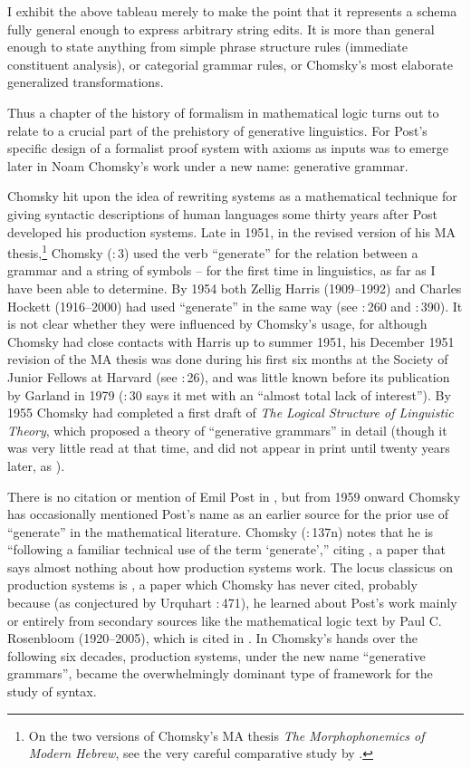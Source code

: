 \documentclass[output=paper]{langscibook}
\begin{document}
I exhibit the above tableau merely to make the point that it represents a schema fully general enough to express arbitrary string edits. It is more than general enough to state anything from simple phrase structure rules (immediate constituent analysis), or categorial grammar rules, or Chomsky's most elaborate generalized transformations.

Thus a chapter of the history of formalism in mathematical logic turns out to relate to a crucial part of the prehistory of generative linguistics. For Post's specific design of a formalist proof system with axioms as inputs was to emerge later in Noam Chomsky's work under a new name: generative grammar.

Chomsky hit upon the idea of rewriting systems as a mathematical technique for giving syntactic descriptions of human languages some thirty years after Post developed his production systems.  Late in 1951, in the revised version of his MA thesis,\footnote{On the two versions of Chomsky's MA thesis \textit{The Morphophonemics of Modern Hebrew}, see the very careful comparative study by \citet{Daniels10}.} Chomsky (\citeyear{Chomsky51b}:\,3) used the verb ``generate'' for the relation between a grammar and a string of symbols – for the first time in linguistics, as far as I have been able to determine.  By 1954 both Zellig Harris (1909--1992) and Charles Hockett (1916--2000) had used ``generate'' in the same way (see \citealt{Harris54transfer}:\,260 and \citealt{Hockett54}:\,390). It is not clear whether they were influenced by Chomsky's usage, for although Chomsky had close contacts with Harris up to summer 1951, his December 1951 revision of the MA thesis was done during his first six months at the Society of Junior Fellows at Harvard (see \citealt{Chomsky75LSLT}:\,26), and was little known before its publication by Garland in 1979 (\citealt{Chomsky75LSLT}:\,30 says it met with an ``almost total lack of interest''). By 1955 \nocite{Chomsky55LSLT} Chomsky had completed a first draft of \textit{The Logical Structure of Linguistic Theory}, which proposed a theory of ``generative grammars'' in detail (though it was very little read at that time, and did not appear in print until twenty years later, as \citealt{Chomsky75LSLT}).

There is no citation or mention of Emil Post in \citet{Chomsky55LSLT}, but from 1959 onward Chomsky has occasionally mentioned Post's name as an earlier source for the prior use of ``generate'' in the mathematical literature. Chomsky (\citeyear{Chomsky59CFPG}:\,137n) notes that he is ``following a familiar technical use of the term `generate','' citing \citet{Post44}, a paper that says almost nothing about how production systems work. The locus classicus on production systems is \citet{Post43}, a paper which Chomsky has never cited, probably because (as conjectured by Urquhart \citeyear{Urquhart09}:\,471), he learned about Post's work mainly or entirely from secondary sources like the \citeyear{Rosenbloom50} mathematical logic text by Paul C. Rosenbloom (1920--2005), which is cited in \citet{Chomsky75LSLT}. In Chomsky's hands over the following six decades, production systems, under the new name ``generative grammars'', became the overwhelmingly dominant type of framework for the study of syntax.
\end{document}
